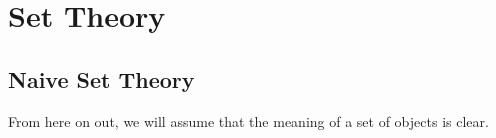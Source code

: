 \chapter{Set Theory}

\section{Naive Set Theory}
From here on out, we will assume that the meaning of a set of objects is clear.




